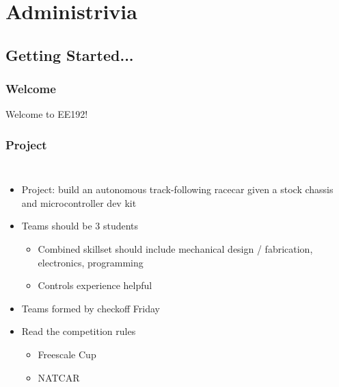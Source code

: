 \documentclass{beamer}
\begin{document}
\begin{frame}
\titlepage

\setcounter{tocdepth}{1}
\tableofcontents
\end{frame}


\section{Administrivia} %
\subsection{Getting Started...}
\begin{frame}
\frametitle{Welcome}
\begin{center}
{\huge Welcome to EE192!}
\end{center}
\end{frame}

\begin{frame}
\frametitle{Project}
\begin{columns}[t]
\begin{itemize}
  \item Project: build an autonomous track-following racecar given a stock chassis and microcontroller dev kit
  \item Teams should be 3 students
  \begin{itemize}
    \item Combined skillset should include mechanical design / fabrication, electronics, programming
    \item Controls experience helpful
  \end{itemize}
  \item Teams formed by checkoff Friday
  \item Read the competition rules
  \begin{itemize}
    \item Freescale Cup
    \item NATCAR
  \end{itemize}
\end{itemize}

\end{columns}
\end{frame}
\end{document}
